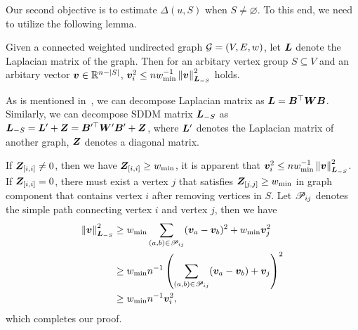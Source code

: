 \documentclass[journal]{IEEEtran}
\begin{document}
Our second objective is to estimate \(\Delta(u,S)\) when \(S\neq\varnothing\).
To this end, we need to utilize the following lemma.

\begin{lemma}\label{lem:norm-ineq}
    Given a connected weighted undirected graph \(\mathcal{G}=(V,E,w)\), let \(\boldsymbol{L}\) denote the Laplacian matrix of the graph.
    Then for an arbitary vertex group \(S\subseteq V\) and an arbitary vector \(\boldsymbol{v}\in\mathbb{R}^{n-\left|S \right|}\), \(\boldsymbol{v}_i^2\le nw_{\min}^{-1}\left\Vert\boldsymbol{v}\right\Vert^2_{\boldsymbol{L}_{-S}}\) holds.
\end{lemma}

\begin{IEEEproof}
    As is mentioned in~, we can decompose Laplacian matrix as \(\boldsymbol{L}=\boldsymbol{B}^\top\boldsymbol{W}\boldsymbol{B}\).
    Similarly, we can decompose SDDM matrix \(\boldsymbol{L}_{-S}\) as \(\boldsymbol{L}_{-S}=\boldsymbol{L}'+\boldsymbol{Z}=\boldsymbol{B}'^\top\boldsymbol{W}'\boldsymbol{B}'+\boldsymbol{Z}\), where \(\boldsymbol{L}'\) denotes the Laplacian matrix of another graph, \(\boldsymbol{Z}\) denotes a diagonal matrix.

    If \(\boldsymbol{Z}_{[i,i]}\neq0\), then we have \(\boldsymbol{Z}_{[i,i]}\ge w_{\min}\), it is apparent that \(\boldsymbol{v}_i^2\le nw_{\min}^{-1}\left\Vert\boldsymbol{v}\right\Vert^2_{\boldsymbol{L}_{-S}}\).
    If \(\boldsymbol{Z}_{[i,i]}=0\), there must exist a vertex \(j\) that satisfies \(\boldsymbol{Z}_{[j,j]}\ge w_{\min}\) in graph component that contains vertex \(i\) after removing vertices in \(S\).
    Let \(\mathscr{P}_{ij}\) denotes the simple path connecting vertex \(i\) and vertex \(j\), then we have
    \begin{align*}
        \left\Vert\boldsymbol{v}\right\Vert^2_{\boldsymbol{L}_{-S}}
         & \ge w_{\min}\sum_{\left( a,b \right)\in\mathscr{P}_{ij}}(\boldsymbol{v}_a-\boldsymbol{v}_b)^2+w_{\min}\boldsymbol{v}_j^2     \\
         & \ge w_{\min}n^{-1}\left( \sum_{\left( a,b \right)\in\mathscr{P}_{ij}}(\boldsymbol{v}_a-\boldsymbol{v}_b)+\boldsymbol{v}_j \right)^2 \\
         & \ge w_{\min}n^{-1}\boldsymbol{v}_i^2,
    \end{align*}
    which completes our proof.
\end{IEEEproof}
\end{document}
